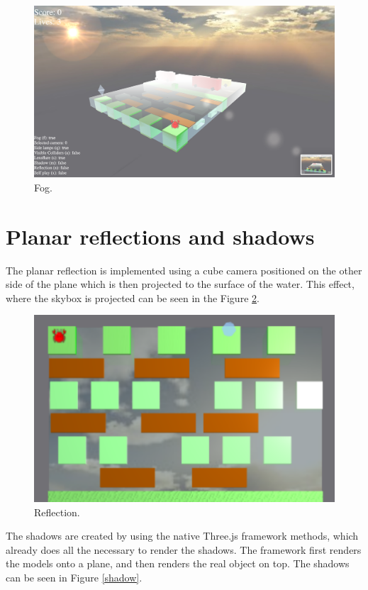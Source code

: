 \documentclass[a4paper,10pt, twocolumn]{article}
\begin{document}
\begin{figure}[!htb]
	\centering
	\includegraphics[width=\linewidth]{images/fog.png}
  	\caption{Fog.}
	\label{fog}
\end{figure}

\section{Planar reflections and shadows}
The planar reflection is implemented using a cube camera positioned on the other side of the plane which is then projected to the surface of the water. This effect, where the skybox is projected can be seen in the Figure \ref{reflection}.

\begin{figure}[!htb]
	\centering
 	\includegraphics[width=\linewidth]{images/reflection.png}
  	\caption{Reflection.}
	\label{reflection}
\end{figure}

The shadows are created by using the native  Three.js framework methods, which already does all the necessary to render the shadows. The framework first renders the models onto a plane, and then renders the real object on top. The shadows can be seen in Figure \ref{shadow}.
\end{document}
